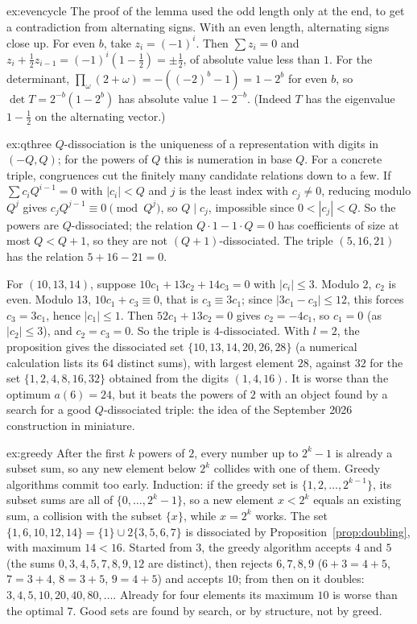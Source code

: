 \begin{solution}{ex:evencycle}
\idea The proof of the lemma used the odd length only at the end, to get a contradiction from alternating signs. With an even length,
alternating signs close up.
\writeup For even $b$, take $z_i=(-1)^i$. Then $\sum z_i=0$ and $z_i+\frac12z_{i-1}=(-1)^i(1-\frac12)=\pm\frac12$, of absolute value less than $1$. For the determinant,
$\prod_\omega(2+\omega)=-((-2)^b-1)=1-2^b$ for even $b$, so $\det T=2^{-b}(1-2^b)$ has absolute value $1-2^{-b}$. (Indeed $T$ has the eigenvalue $1-\frac12$ on the
alternating vector.)
\end{solution}

\begin{solution}{ex:qthree}
\idea $Q$-dissociation is the uniqueness of a representation with digits in $(-Q,Q)$; for the powers of $Q$ this is numeration in base $Q$. For a concrete
triple, congruences cut the finitely many candidate relations down to a few.
\writeup If $\sum c_iQ^{i-1}=0$ with $|c_i|<Q$ and $j$ is the least index with $c_j\ne0$, reducing modulo $Q^j$ gives $c_jQ^{j-1}\equiv0\pmod{Q^j}$, so $Q\mid c_j$, impossible
since $0<|c_j|<Q$. So the powers are $Q$-dissociated; the relation $Q\cdot1-1\cdot Q=0$ has coefficients of size at most $Q<Q+1$, so they are not
$(Q+1)$-dissociated. The triple $(5,16,21)$ has the relation $5+16-21=0$.

For $(10,13,14)$, suppose $10c_1+13c_2+14c_3=0$ with $|c_i|\le3$. Modulo $2$, $c_2$ is even. Modulo $13$, $10c_1+c_3\equiv0$, that is $c_3\equiv3c_1$; since
$|3c_1-c_3|\le12$, this forces $c_3=3c_1$, hence $|c_1|\le1$. Then $52c_1+13c_2=0$ gives $c_2=-4c_1$, so $c_1=0$ (as $|c_2|\le3$), and $c_2=c_3=0$. So the triple is $4$-dissociated.
With $l=2$, the proposition gives the dissociated set $\{10,13,14,20,26,28\}$ (a numerical calculation lists its $64$ distinct sums), with largest element $28$, against $32$
for the set $\{1,2,4,8,16,32\}$ obtained from the digits $(1,4,16)$. It is worse than the optimum $a(6)=24$, but it beats the powers of $2$ with an
object found by a search for a good $Q$-dissociated triple: the idea of the September 2026 construction in miniature.
\end{solution}

\begin{solution}{ex:greedy}
\idea After the first $k$ powers of $2$, every number up to $2^k-1$ is already a subset sum, so any new element below $2^k$ collides with one of them.
Greedy algorithms commit too early.
\writeup Induction: if the greedy set is $\{1,2,\dots,2^{k-1}\}$, its subset sums are all of $\{0,\dots,2^k-1\}$, so a new element $x<2^k$ equals an existing
sum, a collision with the subset $\{x\}$, while $x=2^k$ works. The set $\{1,6,10,12,14\}=\{1\}\cup2\{3,5,6,7\}$ is dissociated by Proposition~\ref{prop:doubling}, with maximum
$14<16$. Started from $3$, the greedy algorithm accepts $4$ and $5$ (the sums $0,3,4,5,7,8,9,12$ are distinct), then rejects $6,7,8,9$ ($6+3=4+5$, $7=3+4$, $8=3+5$,
$9=4+5$) and accepts $10$; from then on it doubles: $3,4,5,10,20,40,80,\dots$. Already for four elements its maximum $10$ is worse than the optimal
$7$. Good sets are found by search, or by structure, not by greed.
\end{solution}

